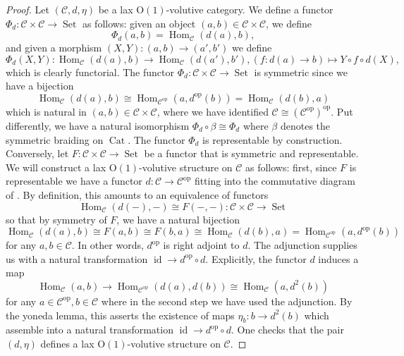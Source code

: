 \documentclass{article}
\newcommand{\opp}{\operatorname{op}}%
\newcommand{\id}{\operatorname{id}}%
\newcommand{\Cat}{\operatorname{Cat}}%
\newcommand{\Set}{\operatorname{Set}}%
\newcommand{\Hom}{\operatorname{Hom}}%
\newcommand{\Oone}{\operatorname{O(1)}}
\newcommand{\C}{\mathcal{C}}
\numberwithin{equation}{section}
\theoremstyle{definition}
\theoremstyle{theorem}
\begin{document}
\begin{proof}
    Let $(\C,d,\eta)$ be a lax $\Oone$-volutive category. We define a functor $\Phi_d \colon \C \times \C \to \Set$ as follows: 
    given an object $(a,b) \in \C \times \C$, we define 
    \begin{equation}
        \Phi_d(a,b) = \Hom_{\C}(d(a),b),
    \end{equation}
    and given a morphism $(X,Y) \colon (a,b) \to (a',b')$ we define 
    \begin{equation}
        \Phi_d(X,Y) \colon \Hom_{\C}(d(a),b) \to \Hom_{\C}(d(a'),b'), (f \colon d(a) \to b) \mapsto Y \circ f \circ d(X),
    \end{equation}
    which is clearly functorial. The functor $\Phi_d \colon \C \times \C \to \Set$ is symmetric since we have a bijection
    \begin{equation}
        \Hom_{\C}(d(a),b) \cong \Hom_{\C^{\opp}}(a,d^{\opp}(b)) = \Hom_{\C}(d(b),a)
    \end{equation}
    which is natural in $(a,b) \in \C \times \C$, where we have identified $\C \cong (\C^{\opp})^{\opp}$. Put differently, 
    we have a natural isomorphism $\Phi_d \circ \beta \cong \Phi_d$ where $\beta$ denotes the symmetric braiding on $\Cat$.
    The functor $\Phi_d$ is representable by construction. \\
    Conversely, let $F \colon \C \times \C \to \Set$ be a functor that is symmetric and representable. We will construct a lax $\Oone$-volutive structure on $\C$ 
    as follows: first, since $F$ is representable we have a functor $d \colon \C \to \C^{\opp}$ fitting into the commutative diagram of
    . By definition, this amounts to an equivalence of functors
    \begin{equation}
        \Hom_{\C}(d(-),-) \cong F(-,-) \colon \C \times \C \to \Set
    \end{equation}
    so that by symmetry of $F$, we have a natural bijection 
    \begin{equation}
        \Hom_{\C}(d(a),b) \cong F(a,b) \cong F(b,a) \cong \Hom_{\C}(d(b),a) = \Hom_{\C^{\opp}}(a,d^{\opp}(b))
    \end{equation}
    for any $a,b \in \C$. In other words, $d^{\opp}$ is right adjoint to $d$. The adjunction supplies us with a natural transformation $\id \to d^{\opp} \circ d$. 
    Explicitly, the functor $d$ induces a map
    \begin{equation}
        \Hom_{\C}(a,b) \to \Hom_{\C^{\opp}}(d(a),d(b)) \cong \Hom_{\C}(a,d^2(b))
    \end{equation}
    for any $a \in \C^{\opp}, b \in \C$ where in the second step we have used the adjunction. By the yoneda lemma, this
    asserts the existence of maps $\eta_b \colon b \to d^2(b)$ which assemble into a natural transformation $\id \to d^{\opp} \circ d$.
    One checks that the pair $(d,\eta)$ defines a lax $\Oone$-volutive structure on $\C$.
\end{proof}
\end{document}
